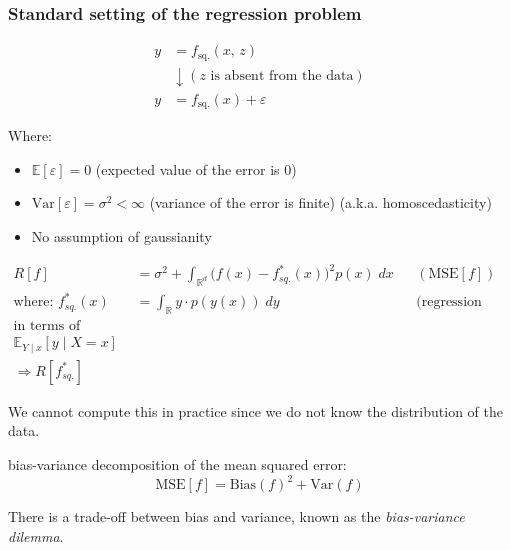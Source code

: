 \subsubsection{Standard setting of the regression problem}

\begin{align*}
	y & = f_\text{sq.}(x,\, z)                         \\
	  & \downarrow (z \text{ is absent from the data}) \\
	y & = f_\text{sq.}(x) + \varepsilon
\end{align*}

Where:
\begin{itemize}
	\item \(\mathds{E}[\varepsilon] = 0\) (expected value of the error is 0)
	\item \(\text{Var}[\varepsilon] = \sigma^2 < \infty\) (variance of the error is finite) (a.k.a. homoscedasticity)
	\item No assumption of gaussianity
\end{itemize}

\begin{prop}{}{}
	\begin{align*}
		R[f]                        & = \sigma^2 + \int_{\mathds{R}^d} \bigl(f(x) - f^*_{sq.}(x)\bigr)^2 p(x)\; dx
		                            &                                                                              & (\text{MSE}[f])              \\
		\text{where: } f^*_{sq.}(x) & = \int_{\mathds{R}} y\cdot p(y(x))\; dy
		                            &                                                                              & \text{(regression function)} \\
		\text{in terms of statistics: }                                                                                                           \\ \mathds{E}_{Y \mid x}[y \mid X = x] \\
		\Rightarrow R[f^*_{sq.}]
	\end{align*}
	\tcblower
	\begin{note}
		We cannot compute this in practice since we do not know the distribution
		of the data.
	\end{note}
\end{prop}

\begin{prop}{bias-variance decomposition}{}
	of the mean squared error:
	\[\text{MSE}[f] = \text{Bias}(f)^2 + \text{Var}(f)
	\]

	There is a trade-off between bias and variance, known as the
	\emph{bias-variance dilemma}.
\end{prop}

